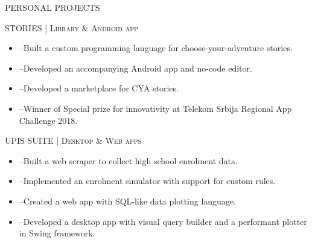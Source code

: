 \begin{minipage}[t]{\linewidth}
{\titleFont\light PERSONAL PROJECTS}\newline

\vspace{\titleBottomMargin}
{\subtitleFont\bold STORIES \extraLight\scshape| Library \& Android app \href{https://github.com/luka-j/stories}{\faGithub} \href{https://github.com/luka-j/StoriesApp}{\faGithub}}\newline

\vspace{\ribbonTopMargin}
\ribbonJava \ribbonAndroid \ribbonPlay \ribbonPostgres\newline
\vspace{\ribbonBottomMargin}

{\contentFont \begin{itemize}
    \item --Built a custom programming language for choose-your-adventure stories.
    \item --Developed an accompanying Android app and no-code editor.
    \item --Developed a marketplace for CYA stories.
    \item --Winner of Special prize for innovativity at Telekom Srbija Regional App Challenge 2018.
\end{itemize}}
\end{minipage}\newline%
%
\begin{minipage}[t]{\linewidth}\vspace{\subsectionSpace}
{\subtitleFont\bold UPIS SUITE \extraLight\scshape| Desktop \& Web apps \href{https://github.com/luka-j/UpisScraper}{\faGithub} \href{https://github.com/luka-j/UpisStats}{\faGithub} \href{https://github.com/luka-j/UpisDesktop}{\faGithub}}\newline

\vspace{\ribbonTopMargin}
\ribbonJava \ribbonPlay \ribbonSwing \ribbonPostgres \ribbonJavascript\newline
\vspace{\ribbonBottomMargin}

{\contentFont \begin{itemize}
    \item --Built a web scraper to collect high school enrolment data.
    \item --Implemented an enrolment simulator with support for custom rules.
    \item --Created a web app with SQL-like data plotting language.
    \item --Developed a desktop app with visual query builder and a performant plotter in Swing framework.
\end{itemize}}
\end{minipage}\newline%
